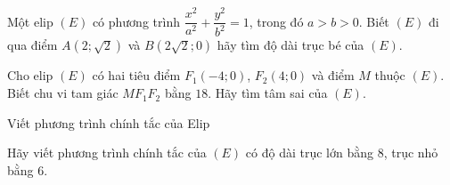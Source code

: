 \begin{vd}%
	Một elip $(E)$ có phương trình $\dfrac{x^2}{a^2}+\dfrac{y^2}{b^2}=1$, trong đó $a>b>0$. Biết $(E)$ đi qua điểm $A\left(2;\sqrt{2}\right)$ và $B\left(2\sqrt{2};0\right)$ hãy tìm độ dài trục bé của $ (E) $.
\end{vd}
\begin{vd}%
	Cho elip $(E)$ có hai tiêu điểm $F_1(-4;0)$, $F_2(4;0)$ và điểm $M$ thuộc $(E)$. Biết chu vi tam giác $MF_1F_2$ bằng $18$. Hãy tìm tâm sai của $(E)$.
\end{vd}
\begin{dang}{Viết phương trình chính tắc của Elip}
\end{dang}
\begin{vd}%
	Hãy viết phương trình chính tắc của $(E)$ có độ dài trục lớn bằng $8$, trục nhỏ bằng $6$.
\end{vd}
